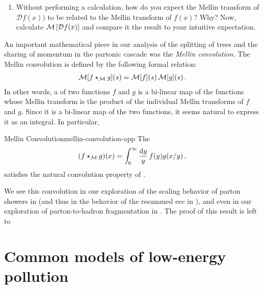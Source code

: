 \begin{subappendices}
\begin{exercise}
\begin{enumerate}[label=\roman*)]
        \item
            Without performing a calculation, how do you expect the Mellin transform of \(\mathcal{D} f(x))\) to be related to the Mellin transform of \(f(x)\)?
            Why?
            Now, calculate \(\mathcal{M}\left[\mathcal{D} f(x)\right]\) and compare it the result to your intuitive expectation.
    \end{enumerate}
\end{exercise}



An important mathematical piece in our analysis of the splitting of trees and the sharing of momentum in the partonic cascade was the \textit{Mellin convolution}.
%
The Mellin convolution is defined by the following formal relation:
\begin{align}
    \label{eq:convolution-property}
    \mathcal{M}[f \mellinconvolution g](s)
    =
    \mathcal{M}[f](s) \, \mathcal{M}[g](s)
    \,.
\end{align}
In other words, a  of two functions \(f\) and \(g\) is a bi-linear map of the functions whose Mellin transform is the product of the individual Mellin transforms of \(f\) and \(g\).
%
Since it is a bi-linear map of the two functions, it seems natural to express it as an integral.
%
In particular,
\begin{proposition}{Mellin Convolution}{mellin-convolution-app}
    The 
    \begin{align}
        (f \star_{\mathcal M} g)(x)
        =
        \int_0^\infty \frac{\dd y}{y}\, f(y) g(x/y)
        \,,
    \end{align}
    satisfies the natural convolution property of .
\end{proposition}
%
We see this convolution in our exploration of the scaling behavior of parton showers in  (and thus in the behavior of the resummed \gls{eec} in ), and even in our exploration of parton-to-hadron fragmentation in .
%
The proof of this result is left to 




\section{Common models of low-energy pollution}
\label{app:pollution-models}


\end{subappendices}
